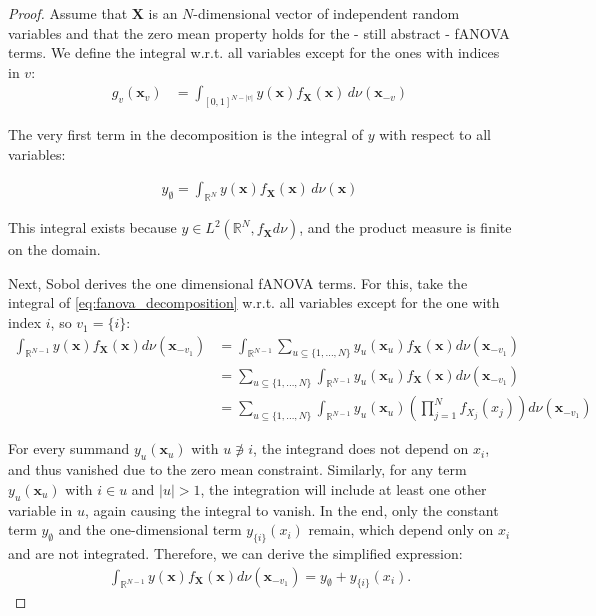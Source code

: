 \begin{proof}
    Assume that $\boldsymbol{X}$ is an $N$-dimensional vector of independent random variables and that the zero mean property holds for the - still abstract - fANOVA terms. We define the integral w.r.t. all variables except for the ones with indices in \( v \):
    \begin{align}
        g_v(\boldsymbol{x}_v) &= \int_{[0, 1]^{N - |v|}} y(\boldsymbol{x}) f_{\boldsymbol{X}}(\boldsymbol{x}) \, d\nu (\boldsymbol{x}_{-v})
    \end{align}

The very first term in the decomposition is the integral of \( y \) with respect to all variables:

\begin{align}
    y_{\emptyset} = \int_{\mathbb{R}^N} y(\boldsymbol{x}) f_{\boldsymbol{X}}(\boldsymbol{x}) \, d\nu(\boldsymbol{x}) \label{eq:y_emptyset}
\end{align}

This integral exists because \( y \in L^2(\mathbb{R}^N, f_{\boldsymbol{X}} d\nu) \), and the product measure is finite on the domain.

Next, Sobol derives the one dimensional fANOVA terms. For this, take the integral of \autoref{eq:fanova_decomposition} w.r.t. all variables except for the one with index \( i \), so $v_1 = \{i\}$:
\begin{align}
    \int_{\mathbb{R}^{N-1}} y(\boldsymbol{x}) f_{\boldsymbol{X}}(\boldsymbol{x}) d\nu (\boldsymbol{x}_{-v_1}) 
    &= \int_{\mathbb{R}^{N-1}} \sum_{u \subseteq \{1, \dots, N\}} y_{u}(\boldsymbol{x}_u) f_{\boldsymbol{X}}(\boldsymbol{x}) d\nu (\boldsymbol{x}_{-v_1}) \\
    &= \sum_{u \subseteq \{1, \dots, N\}} \int_{\mathbb{R}^{N-1}} y_{u}(\boldsymbol{x}_u) f_{\boldsymbol{X}}(\boldsymbol{x}) d\nu (\boldsymbol{x}_{-v_1}) \\
    &= \sum_{u \subseteq \{1, \dots, N\}} \int_{\mathbb{R}^{N-1}} y_{u}(\boldsymbol{x}_u) \left( \prod_{j=1}^N f_{X_j}(x_j) \right) d\nu (\boldsymbol{x}_{-v_1})
\end{align}

For every summand \( y_u(\boldsymbol{x}_u) \) with \( u \not\ni i \), the integrand does not depend on \( x_i \), and thus vanished due to the zero mean constraint.
Similarly, for any term \( y_u(\boldsymbol{x}_u) \) with \( i \in u \) and \( |u| > 1 \), the integration will include at least one other variable in \( u \), again causing the integral to vanish.
In the end, only the constant term \( y_{\emptyset} \) and the one-dimensional term \( y_{\{i\}}(x_i) \) remain, which depend only on \( x_i \) and are not integrated.
Therefore, we can derive the simplified expression:
\begin{align}
    \int_{\mathbb{R}^{N-1}} y(\boldsymbol{x}) f_{\boldsymbol{X}}(\boldsymbol{x}) d\nu (\boldsymbol{x}_{-v_1}) = y_{\emptyset} + y_{\{i\}}(x_i).
\end{align}


\end{proof}
